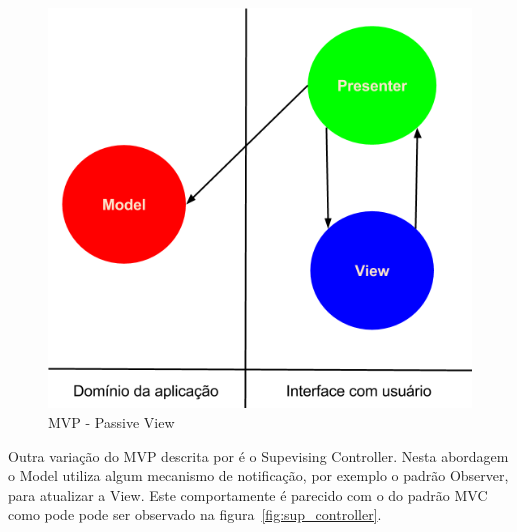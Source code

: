 \documentclass[conference]{IEEEtran}
\begin{document}
\begin{figure}[htb]
	\begin{center}
		\includegraphics[scale=0.45]{img/passive_view.png}
	\end{center}
	\caption{\label{fig:mvp_passive_view} MVP - Passive View}
	
\end{figure}

Outra variação do MVP descrita por \cite{fowler:sp} é o Supevising
Controller. Nesta abordagem o Model utiliza algum mecanismo de notificação, por
exemplo o padrão Observer, para atualizar a View. Este comportamente é parecido
com o do padrão MVC como pode pode ser observado na
figura~\ref{fig:sup_controller}.
\end{document}
